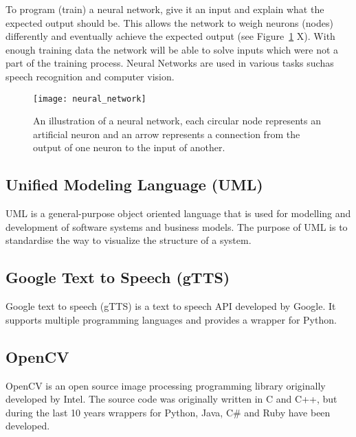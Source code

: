 \documentclass[../main.tex]{subfiles}
\begin{document}
To program (train) a neural network, give it an input and explain what the
expected output should be. This allows the network to weigh neurons (nodes)
differently and eventually achieve the expected output (see 
Figure~\ref{fig:neural_network} X). With enough training data the network will
be able to solve inputs which were not a part of the training process. Neural
Networks are used in various tasks suchas speech recognition and computer
vision. 

\begin{figure}[ht]
  \centering
  \texttt{[image: neural\_network]}
  \caption{
    An illustration of a neural network, each circular node represents
    an artificial neuron and an arrow represents a connection from the output
    of one neuron to the input of another.\label{fig:neural_network}
  }
\end{figure}

\subsection{Unified Modeling Language (UML)}

UML is a general-purpose object oriented language that is used for modelling
and development of software systems and business models. The purpose of UML is
to standardise the way to visualize the structure of a system. 

\subsection{Google Text to Speech (gTTS)}

Google text to speech (gTTS) is a text to speech API developed by Google. It
supports multiple programming languages and provides a wrapper for Python.

\subsection{OpenCV}

OpenCV is an open source image processing programming library originally
developed by Intel. The source code was originally written in C and C++, but
during the last 10 years wrappers for Python, Java, C\# and Ruby have been
developed.
\end{document}
